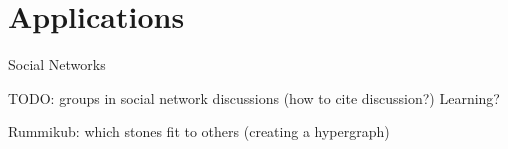 \chapter{Applications}\label{chapter:applications}
Social Networks \cite{ghoshal2009random}
\cite{zhang2010hypergraph}

TODO: groups in social network discussions (how to cite discussion?)
Learning?

Rummikub: which stones fit to others (creating a hypergraph)
